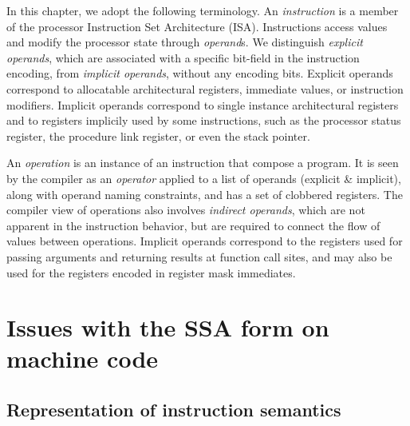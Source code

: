In this chapter, we adopt the following terminology. An \emph{instruction} is a
member of the processor Instruction Set Architecture (ISA). Instructions access
values and modify the processor state through \emph{operand}s. We distinguish
\emph{explicit operands}, which are associated with a specific bit-field in the
instruction encoding, from \emph{implicit operands}, without any encoding bits.
Explicit operands correspond to allocatable architectural registers, immediate
values, or instruction modifiers. Implicit operands correspond to single
instance architectural registers and to registers implicily used by some
instructions, such as the processor status register, the procedure link
register, or even the stack pointer.

An \emph{operation} is an instance of an instruction that compose a program. It
is seen by the compiler as an \emph{operator} applied to a list of operands
(explicit \& implicit), along with operand naming constraints, and has a set of
clobbered registers. The compiler view of operations also involves
\emph{indirect operands}, which are not apparent in the instruction behavior,
but are required to connect the flow of values between operations.  Implicit
operands correspond to the registers used for passing arguments and returning
results at function call sites, and may also be used for the registers
encoded in register mask immediates.


\section{Issues with the SSA form on machine code}
\label{sec:ssa-codegen-issues}

\subsection{Representation of instruction semantics}

